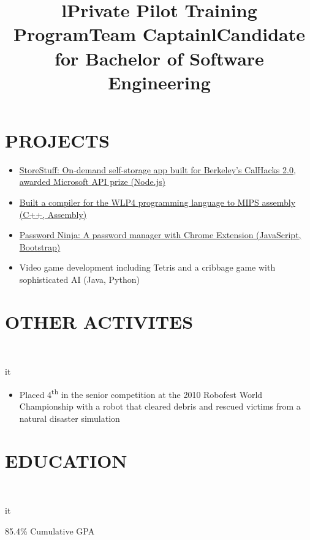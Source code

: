 \documentclass[]{res}
\begin{document}
\begin{resume}
\section{PROJECTS}
  \begin{itemize}
    \item \href{https://github.com/paulashbourne/storestuff}
      {StoreStuff: On-demand self-storage app built for Berkeley's CalHacks 2.0, awarded Microsoft API prize (Node.js)}
    \item \href{https://github.com/paulashbourne/wlp4compiler}
      {Built a compiler for the WLP4 programming language to MIPS assembly (C++, Assembly)}
    \item \href{http://password-ninja.com/}
      {Password Ninja: A password manager with Chrome Extension (JavaScript, Bootstrap)}
    \item Video game development including Tetris and a cribbage game with sophisticated AI (Java, Python)
  \end{itemize}

\section{OTHER ACTIVITES}
  \begin{format}  \\ \title{l}{it} \\ \body \end{format}
  \title{Private Pilot Training Program}
  \begin{position}
    \hspace{-100pt}
  \end{position}
  \title{Team Captain}
  \begin{position}
    \begin{itemize}
      \item Placed 4\textsuperscript{th} in the senior competition at the 2010 Robofest World Championship with a robot that
        cleared debris and rescued victims from a natural disaster simulation
    \end{itemize}
  \end{position}

\section{EDUCATION}
  \begin{format}  \\ \title{l}{it} \\ \body \end{format}
  \title{Candidate for Bachelor of Software Engineering}
  \begin{position}
    85.4\% Cumulative GPA
  \end{position}
 
\end{resume}
\end{document}
